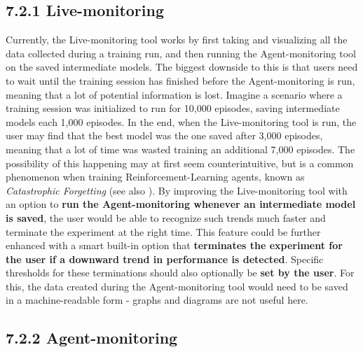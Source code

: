 \subsection*{7.2.1 Live-monitoring}\label{subsec:FutureLiveMonitoring}

Currently, the Live-monitoring tool works by first taking and visualizing all the data collected during a training run, and then running the Agent-monitoring tool on the saved intermediate models. The biggest downside to this is that users need to wait until the training session has finished before the Agent-monitoring is run, meaning that a lot of potential information is lost. Imagine a scenario where a training session was initialized to run for 10,000 episodes, saving intermediate models each 1,000 episodes. In the end, when the Live-monitoring tool is run, the user may find that the best model was the one saved after 3,000 episodes, meaning that a lot of time was wasted training an additional 7,000 episodes. The possibility of this happening may at first seem counterintuitive, but is a common phenomenon when training Reinforcement-Learning agents, known as \emph{Catastrophic Forgetting} (see also \cite{CatastrophicForgetting}). By improving the Live-monitoring tool with an option to \textbf{run the Agent-monitoring whenever an intermediate model is saved}, the user would be able to recognize such trends much faster and terminate the experiment at the right time. This feature could be further enhanced with a smart built-in option that \textbf{terminates the experiment for the user if a downward trend in performance is detected}. Specific thresholds for these terminations should also optionally be \textbf{set by the user}. For this, the data created during the Agent-monitoring tool would need to be saved in a machine-readable form - graphs and diagrams are not useful here.

\subsection*{7.2.2 Agent-monitoring}\label{subsec:FutureAgentMonitoring}

